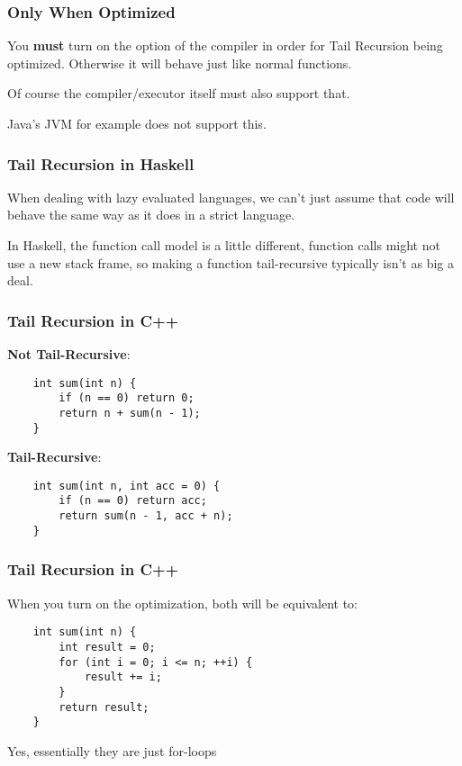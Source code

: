 \documentclass{beamer}
\begin{document}
\begin{frame}
    \frametitle{Only When Optimized}
    You \textbf{must} turn on the option of the compiler in order for Tail Recursion being optimized. Otherwise it will behave just like normal functions.

    Of course the compiler/executor itself must also support that. 

    Java's JVM for example does not support this.
\end{frame}

\begin{frame}
    \frametitle{Tail Recursion in Haskell}
    When dealing with lazy evaluated languages, we can't just assume that code will behave the same way as it does in a strict language.

    In Haskell, the function call model is a little different, function calls might not use a new stack frame, so making a function tail-recursive typically isn't as big a deal.
\end{frame}

\begin{frame}[fragile]
    \frametitle{Tail Recursion in C++}

    \textbullet \textbf{Not Tail-Recursive}:
    \begin{verbatim}
    int sum(int n) {
        if (n == 0) return 0;
        return n + sum(n - 1);
    }
    \end{verbatim}

    \medskip
    \textbullet \textbf{Tail-Recursive}:
    \begin{verbatim}
    int sum(int n, int acc = 0) {
        if (n == 0) return acc;
        return sum(n - 1, acc + n);
    }
    \end{verbatim}
\end{frame}

\begin{frame}[fragile]
    \frametitle{Tail Recursion in C++}

    When you turn on the optimization, both will be equivalent to:

    \medskip
    \begin{verbatim}
    int sum(int n) {
        int result = 0;
        for (int i = 0; i <= n; ++i) {
            result += i;
        }
        return result;
    }
    \end{verbatim}

    Yes, essentially they are just for-loops
\end{frame}
\end{document}
